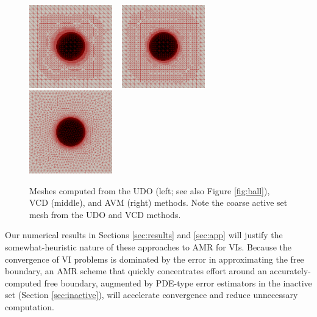 \documentclass[]{interact}
\theoremstyle{plain}%
\theoremstyle{definition}
\theoremstyle{remark}
\begin{document}
\begin{figure}[ht]
\noindent \hspace{-1mm} \mbox{\includegraphics[width=0.32\textwidth]{static/sphereudo.png} \, \includegraphics[width=0.32\textwidth]{static/spherevcd.png} \,\,\includegraphics[width=0.32\textwidth]{static/sphereavm.png}}
\caption{Meshes computed from the UDO (left; see also Figure \ref{fig:ball}), VCD (middle), and AVM (right) methods.  Note the coarse active set mesh from the UDO and VCD methods.}
\label{fig:threeballmeshes}
\end{figure}

Our numerical results in Sections \ref{sec:results} and \ref{sec:app} will justify the somewhat-heuristic nature of these approaches to AMR for VIs.  Because the convergence of VI problems is dominated by the error in approximating the free boundary, an AMR scheme that quickly concentrates effort around an accurately-computed free boundary, augmented by PDE-type error estimators in the inactive set (Section \ref{sec:inactive}), will accelerate convergence and reduce unnecessary computation.
\end{document}
